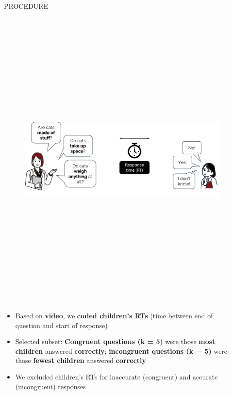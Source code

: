\documentclass[final]{beamer}
\newlength{\colwidth}
\newlength{\widecolwidth}
\begin{document}
\begin{frame}[t]
\begin{columns}[t]
\begin{column}{\colwidth}
\begin{block}{PROCEDURE}
    \begin{figure}
      \centering
	{\includegraphics[height=15.5cm]{images/procedure6.png}}\\[-1ex]
    \end{figure}

    \begin{itemize}
	\item Based on \textbf{video}, we \textbf{coded children's RTs} (time between end of question and start of response)
	\item Selected subset: \textbf{Congruent questions (k = 5)} were those \textbf{most children} answered \textbf{correctly}; \textbf{incongruent questions (k = 5)} were those \textbf{fewest children} answered \textbf{correctly}
	\item We excluded children's RTs for inaccurate (congruent) and accurate (incongruent) responses
    \end{itemize}
    
  \end{block}

\end{column}

\begin{column}{\widecolwidth}


\end{column}
\end{columns}
\end{frame}
\end{document}
